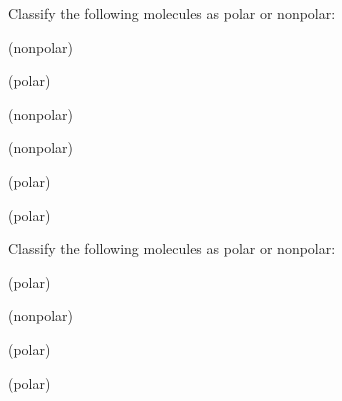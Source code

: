\documentclass[main.tex]{subfiles}
\begin{document}
\begin{multicols*}{2}
\begin{question}[ID=\the\value{numA}]
Classify the following molecules as polar or nonpolar:
\begin{inparaenum}[(a)]
\item{}  %
\item{}  %
\item {}  %
\item {}  %
\item {}  %
\item {}  %
\end{inparaenum}
\end{question}
\begin{solution}
\begin{inparaenum}[(a)]
\item{}    (nonpolar)
\item{}    (polar)
\item {}    (nonpolar)
\item {}    (nonpolar)
\item {}    (polar)
\item {}    (polar)
\end{inparaenum}\hspace{0.1cm}\end{solution}



\begin{question}[ID=\the\value{numA}]
Classify the following molecules as polar or nonpolar:
\begin{inparaenum}[(a)]
\item {}  %
\item{}  %
\item {}  %
\item {}  %
\end{inparaenum}
\end{question}
\begin{solution}
\begin{inparaenum}[(a)]
\item {}    (polar)
\item{}    (nonpolar)
\item {}    (polar)
\item {}    (polar)
\end{inparaenum}\hspace{0.1cm}\end{solution}





\end{multicols*}
\end{document}
